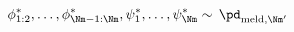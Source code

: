 \begin{equation}
  \phi_{1:2}^{*}, \ldots, \phi_{\Nm - 1:\Nm}^{*}, \psi_{1}^{*}, \ldots, \psi_{\Nm}^{*} 
    \sim \, 
    \pd_{\text{meld}, \Nm'}
  \label{eqn:stage-Mplus1-update}
\end{equation}